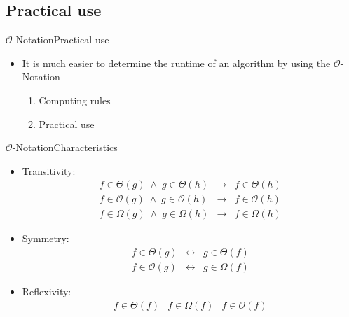 \subsection{Practical use}

\begin{frame}{$\mathcal{O}$-Notation}{Practical use}
  \begin{itemize}
    \item
      It is much easier to determine the runtime of an algorithm by using
      the $\mathcal{O}$-Notation
    \begin{enumerate}
      \item
        Computing rules
      \item
        Practical use
    \end{enumerate}
  \end{itemize}
\end{frame}


\begin{frame}{$\mathcal{O}$-Notation}{Characteristics}
  \begin{itemize}
    \item
      Transitivity:
      \begin{eqnarray*}
        f \in \Theta(g) \; \wedge \; g \in \Theta(h)
        & \rightarrow & f \in \Theta(h)\\
        f \in \mathcal{O}(g) \; \wedge \; g \in \mathcal{O}(h)
        & \rightarrow & f \in \mathcal{O}(h)\\
        f \in \Omega(g) \; \wedge  \; g \in \Omega(h)
        & \rightarrow & f \in \Omega(h)
      \end{eqnarray*}
    \item
      Symmetry:
      \begin{eqnarray*}
        f \in \Theta(g) & \leftrightarrow & g \in \Theta(f)\\
        f \in \mathcal{O}(g)  & \leftrightarrow & g \in \Omega(f)
      \end{eqnarray*}
    \item
      Reflexivity:
      \begin{eqnarray*}
        f \in \Theta(f) & f \in \Omega(f) & f \in \mathcal{O}(f)
      \end{eqnarray*}
  \end{itemize}
\end{frame}


